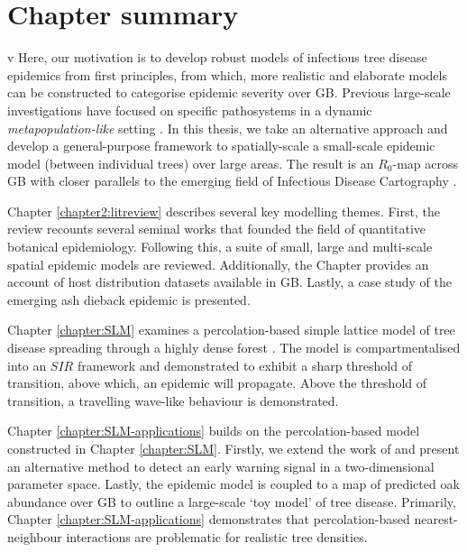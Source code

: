 \section{Chapter summary}

v
Here, our motivation is to develop robust models of infectious tree disease epidemics from first principles,
from which, more realistic and elaborate models can be constructed to categorise epidemic severity over GB.
Previous large-scale investigations have focused on specific pathosystems in a dynamic \textit{metapopulation-like} 
setting \cite{large-scale-control, meentemeyer2011epidemiological, harwood2009epidemiological}.
In this thesis, we take an alternative approach and develop a general-purpose framework to spatially-scale a
small-scale epidemic model (between individual trees) over large areas. The result is an $R_0$-map across GB with closer parallels 
to the emerging field of Infectious Disease Cartography \cite{otieno2021modeling, KRAEMER201619, messina2016mapping}.

Chapter \ref{chapter2:litreview} describes several key modelling themes. First, the review recounts
several seminal works that founded the field of quantitative botanical epidemiology. Following this,
a suite of small, large and multi-scale spatial epidemic models are reviewed. Additionally,
the Chapter provides an account of host distribution datasets available in GB. Lastly, a case study of the emerging
ash dieback epidemic is presented.

Chapter \ref{chapter:SLM} examines a percolation-based simple lattice model of tree disease spreading through a highly
dense forest \cite{OROZCOFUENTES201912}. The model is compartmentalised into an $SIR$ framework and 
demonstrated to exhibit a sharp threshold of transition, above which, an epidemic will propagate. 
Above the threshold of transition, a travelling wave-like behaviour is demonstrated.

Chapter \ref{chapter:SLM-applications} builds on the percolation-based model constructed in Chapter \ref{chapter:SLM}.
Firstly, we extend the work of \cite{OROZCOFUENTES201912} and present an alternative method to detect an early 
warning signal in a two-dimensional parameter space. Lastly, the epidemic model is coupled to a map of 
predicted oak abundance over GB \cite{hill.data} to outline a large-scale `toy model' of tree disease. 
Primarily, Chapter \ref{chapter:SLM-applications} demonstrates that percolation-based nearest-neighbour interactions are
problematic for realistic tree densities. 

